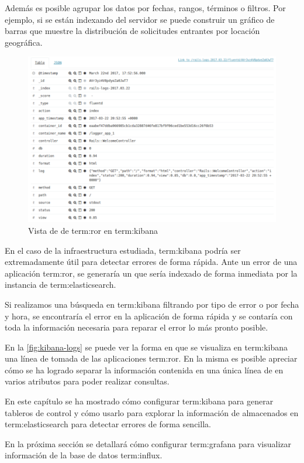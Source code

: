 Además es posible agrupar los datos por fechas, rangos, términos o filtros. Por
ejemplo, si se están indexando  del servidor se puede construir un
gráfico de barras que muestre la distribución de solicitudes 
entrantes por locación geográfica.

\begin{figure}
  \includegraphics[width=\linewidth]{src/images/05-capitulo-5/kibana-logs.png}
  \caption{Vista de  de \gls{term:ror} en \gls{term:kibana}}
  \label{fig:kibana-logs}
\end{figure}

En el caso de la infraestructura  estudiada, \gls{term:kibana} podría ser
extremadamente útil para detectar errores de forma rápida. Ante un error de una
aplicación \gls{term:ror}, se generaría un  que sería indexado de forma
inmediata por la instancia de \gls{term:elasticsearch}.

Si realizamos una búsqueda en \gls{term:kibana} filtrando por tipo de error o
por fecha y hora, se encontraría el error en la aplicación de forma rápida
y se contaría con toda la información necesaria para reparar el error lo más
pronto posible.

En la \autoref{fig:kibana-logs} se puede ver la forma en que se visualiza en
\gls{term:kibana} una línea de  tomada de las aplicaciones
\gls{term:ror}. En la misma es posible apreciar cómo se ha logrado separar la
información contenida en una única línea de  en varios atributos para
poder realizar consultas.

En este capítulo se ha mostrado cómo configurar \gls{term:kibana} para generar
tableros de control y cómo usarlo para explorar la información de 
almacenados en \gls{term:elasticsearch} para detectar errores de forma sencilla.

En la próxima sección se detallará cómo configurar \gls{term:grafana} para
visualizar información de la base de datos \gls{term:influx}.
